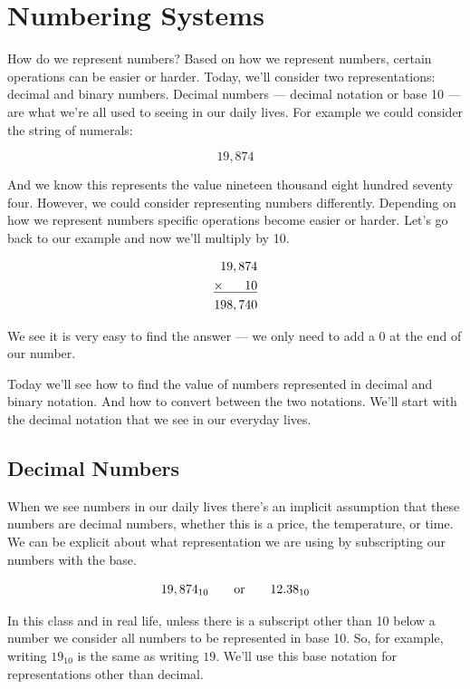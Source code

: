 \chapter{Numbering Systems}
How do we represent numbers? Based on how we represent numbers, certain operations
can be easier or harder. Today, we’ll consider two representations: decimal and
binary numbers. Decimal numbers --- decimal notation or base 10 --- are what we’re
all used to seeing in our daily lives. For example we could consider the string of
numerals:

$$ 19,874 $$

And we know this represents the value nineteen thousand eight hundred seventy four.
However, we could consider representing numbers differently. Depending on how we
represent numbers specific operations become easier or harder. Let’s go back to our
example and now we’ll multiply by 10.

\begin{align*}
19,874&\\
\underline{\times\hspace{6mm}10}&\\
198,740&\\
\end{align*}

We see it is very easy to find the answer --- we only need to add a 0 at the end
of our number.

Today we’ll see how to find the value of numbers represented in decimal and
binary notation. And how to convert between the two notations. We’ll start with
the decimal notation that we see in our everyday lives.

\section{Decimal Numbers}
When we see numbers in our daily lives there’s an implicit assumption that these
numbers are decimal numbers, whether this is a price, the temperature, or time.
We can be explicit about what representation we are using by subscripting our
numbers with the base.

$$ 19,874_{10} \hspace{7mm}\text{or}\hspace{7mm}  12.38_{10}$$

In this class and in real life, unless there is a subscript other than 10 below a number we consider all numbers to be
represented in base 10. So, for example, writing $19_{10}$ is the same as writing $19$. We'll use this base notation for representations other than decimal. 

